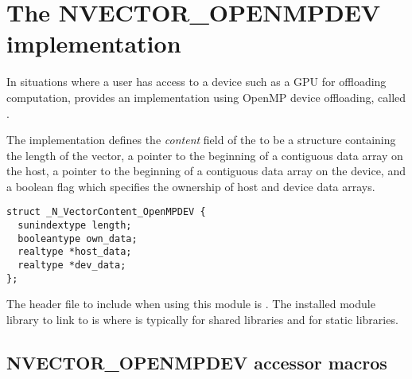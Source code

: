 \section{The NVECTOR\_OPENMPDEV implementation}\label{ss:nvec_openmpdev}

In situations where a user has access to a device such as a GPU for
offloading computation, {\sundials} provides an {\nvector} implementation using
OpenMP device offloading, called {\nvecopenmpdev}.

The {\nvecopenmpdev} implementation defines the \textit{content} field
of the  to be a structure  containing the length of the vector, a pointer
to the beginning of a contiguous  data array on the host, a pointer to the beginning of
a contiguous data array on the device, and a boolean flag  which specifies
the ownership of host and device data arrays.
\begin{verbatim}
struct _N_VectorContent_OpenMPDEV {
  sunindextype length;
  booleantype own_data;
  realtype *host_data;
  realtype *dev_data;
};
\end{verbatim}

The header file to include when using this module is .
The installed module library to link to is
where  is typically  for shared libraries and 
for static libraries.


\subsection{NVECTOR\_OPENMPDEV accessor macros}
\label{ss:nvec_openmpdev_macros}

